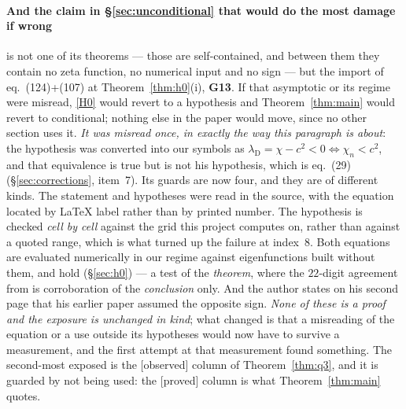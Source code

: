 \documentclass[11pt,a4paper]{article}
\theoremstyle{plain}
\theoremstyle{definition}
\theoremstyle{remark}
\newcommand{\st}[1]{{\normalfont\sffamily\footnotesize[#1]}}
\newcommand{\proved}{\st{proved}}
\newcommand{\observed}{\st{observed}}
\newcommand{\file}[1]{\path{#1}}
\begin{document}
\paragraph{And the claim in \S\ref{sec:unconditional} that would do the most
damage if wrong} is not one of its theorems --- those are self-contained, and
between them they contain no zeta function, no numerical input and no sign --- but
the import of \cite{Dunster2017} eq.\ (124)+(107) at
Theorem~\ref{thm:h0}(i), \textbf{G13}.  If that asymptotic or its regime were
misread, \eqref{H0} would revert to a hypothesis and Theorem~\ref{thm:main}
would revert to conditional; nothing else in the paper would move, since no
other section uses it.  \emph{It was misread once, in exactly the way this
paragraph is about}: the hypothesis was converted into our symbols as
$\lambda_{\mathrm D}=\chi-c^2<0\Leftrightarrow\chi_n<c^2$, and that
equivalence is true but is not his hypothesis, which is eq.~(29)
(\S\ref{sec:corrections}, item~7).  Its guards are now four, and they are of
different kinds.  The statement and hypotheses were read in the source, with
the equation located by \LaTeX{} label rather than by printed number.  The
hypothesis is checked \emph{cell by cell} against the grid this project
computes on, rather than against a quoted range, which is what turned up the
failure at index~$8$.  Both equations are evaluated numerically in our regime
against eigenfunctions built without them, and hold (\S\ref{sec:h0}) --- a test
of the \emph{theorem}, where the $22$-digit agreement from \file{verify_h0.py}
is corroboration of the \emph{conclusion} only.  And the author states on his
second page that his earlier paper assumed the opposite sign.  \emph{None of
these is a proof and the exposure is unchanged in kind}; what changed is that a
misreading of the equation or a use outside its hypotheses would now have to
survive a measurement, and the first attempt at that measurement found
something.  The second-most exposed is the \observed{} column of
Theorem~\ref{thm:q3}, and it is guarded by not being used: the \proved{} column
is what Theorem~\ref{thm:main} quotes.
\end{document}
